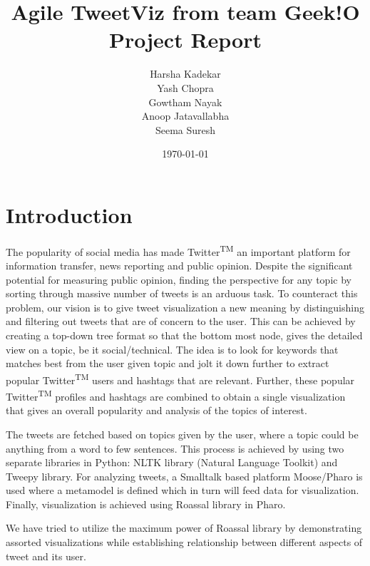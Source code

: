 \documentclass[11pt]{article}
\begin{document}
\title{%
 Agile TweetViz from team Geek!O\\
\large Project Report}
\author{Harsha Kadekar\\
  Yash Chopra\\
  Gowtham Nayak\\
  Anoop Jatavallabha\\
  Seema Suresh}
\date{\today}
\maketitle
\newpage
\tableofcontents
\newpage
\listoffigures
\newpage


\section{Introduction}
The popularity of social media has made Twitter\textsuperscript{TM} an important platform for information transfer, news reporting and public opinion. Despite the significant potential for measuring public opinion, finding the perspective for any topic by sorting through massive number of tweets is an arduous task. To counteract this problem, our vision is to give tweet visualization a new meaning by distinguishing and filtering out tweets that are of concern to the user. This can be achieved by creating a top-down tree format so that the bottom most node, gives the detailed view on a topic, be it social/technical. The idea is to look for keywords that matches best from the user given topic and jolt it down further to extract popular Twitter\textsuperscript{TM} users and hashtags that are relevant. Further, these popular Twitter\textsuperscript{TM} profiles and hashtags are combined to obtain a single visualization that gives an overall popularity and analysis of the topics of interest.

 The tweets are fetched based on topics given by the user, where a topic could be anything from a word to few sentences. This process is achieved by using two separate libraries in Python: NLTK library (Natural Language Toolkit) and Tweepy library. For analyzing tweets, a Smalltalk based platform Moose/Pharo is used where a metamodel is defined which in turn will feed data for visualization. Finally, visualization is achieved using Roassal library in Pharo.
 
We have tried to utilize the maximum power of Roassal library by demonstrating assorted visualizations while establishing relationship between different aspects of tweet and its user. 
\end{document}
